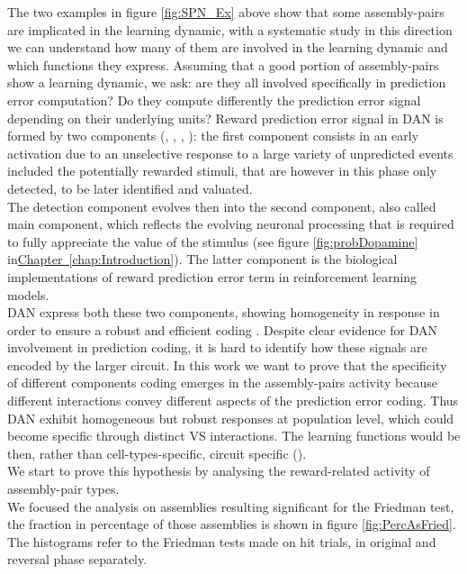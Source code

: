 The two examples in figure \ref{fig:SPN_Ex} above show that some assembly-pairs are implicated in the learning dynamic, with a systematic study in this direction we can understand how many of them are involved in the learning dynamic and which functions they express. Assuming that a good portion of assembly-pairs show a learning dynamic, we ask: are they all involved specifically in prediction error computation? Do they compute differently the prediction error signal depending on their underlying units? Reward prediction error signal in DAN is formed by two components (\cite{Tobler2003}, \cite{Nomoto2010}, \cite{Fiorillo2013}, \cite{Schultz2016}): the first component consists in an early activation due to an unselective response to a large variety of unpredicted events included the potentially rewarded stimuli, that are however in this phase only detected, to be later identified and valuated.\\The detection component evolves then into the second component, also called main component, which reflects the evolving neuronal processing that is required to fully appreciate the value of the stimulus (see figure \ref{fig:probDopamine} in\hyperref[chap:Introduction]{Chapter~\ref*{chap:Introduction}}). The latter component is the biological implementations of reward prediction error term in reinforcement learning models.\\DAN express both these two components, showing homogeneity in response in order to ensure a robust and efficient coding \cite{UchidaDop}. Despite clear evidence for DAN involvement in prediction coding, it is hard to identify how these signals are encoded by the larger circuit. In this work we want to prove that the specificity of different components coding emerges in the assembly-pairs activity because different interactions convey different aspects of the prediction error coding. Thus DAN exhibit homogeneous but robust responses at population level, which could become specific through distinct VS interactions. The learning functions would be then, rather than cell-types-specific, circuit specific (\cite{Saunders2018}).\\
We start to prove this hypothesis by analysing the reward-related activity of assembly-pair types.\\
We focused the analysis on assemblies resulting significant for the Friedman test, the fraction in percentage of those assemblies is shown in figure \ref{fig:PercAsFried}. The histograms refer to the Friedman tests made on hit trials, in original and reversal phase separately.\\
